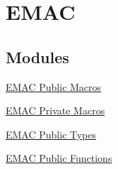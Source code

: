 \hypertarget{group___e_m_a_c}{\section{\-E\-M\-A\-C}
\label{group___e_m_a_c}
}
\subsection*{\-Modules}
\begin{DoxyCompactItemize}
\item 
\hyperlink{group___e_m_a_c___public___macros}{\-E\-M\-A\-C Public Macros}
\item 
\hyperlink{group___e_m_a_c___private___macros}{\-E\-M\-A\-C Private Macros}
\item 
\hyperlink{group___e_m_a_c___public___types}{\-E\-M\-A\-C Public Types}
\item 
\hyperlink{group___e_m_a_c___public___functions}{\-E\-M\-A\-C Public Functions}
\end{DoxyCompactItemize}
